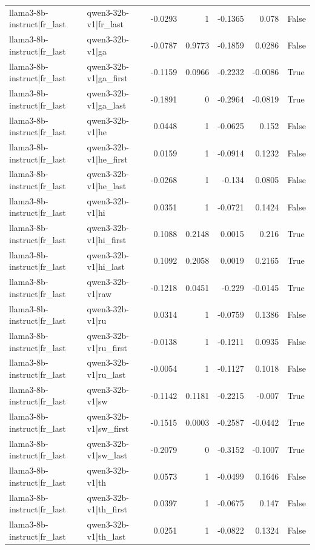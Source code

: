 \begin{table}
\begin{tabular}{l l r r r r l}
llama3-8b-instruct|fr_last & qwen3-32b-v1|fr_last & -0.0293 & 1 & -0.1365 & 0.078 & False \\
llama3-8b-instruct|fr_last & qwen3-32b-v1|ga & -0.0787 & 0.9773 & -0.1859 & 0.0286 & False \\
llama3-8b-instruct|fr_last & qwen3-32b-v1|ga_first & -0.1159 & 0.0966 & -0.2232 & -0.0086 & True \\
llama3-8b-instruct|fr_last & qwen3-32b-v1|ga_last & -0.1891 & 0 & -0.2964 & -0.0819 & True \\
llama3-8b-instruct|fr_last & qwen3-32b-v1|he & 0.0448 & 1 & -0.0625 & 0.152 & False \\
llama3-8b-instruct|fr_last & qwen3-32b-v1|he_first & 0.0159 & 1 & -0.0914 & 0.1232 & False \\
llama3-8b-instruct|fr_last & qwen3-32b-v1|he_last & -0.0268 & 1 & -0.134 & 0.0805 & False \\
llama3-8b-instruct|fr_last & qwen3-32b-v1|hi & 0.0351 & 1 & -0.0721 & 0.1424 & False \\
llama3-8b-instruct|fr_last & qwen3-32b-v1|hi_first & 0.1088 & 0.2148 & 0.0015 & 0.216 & True \\
llama3-8b-instruct|fr_last & qwen3-32b-v1|hi_last & 0.1092 & 0.2058 & 0.0019 & 0.2165 & True \\
llama3-8b-instruct|fr_last & qwen3-32b-v1|raw & -0.1218 & 0.0451 & -0.229 & -0.0145 & True \\
llama3-8b-instruct|fr_last & qwen3-32b-v1|ru & 0.0314 & 1 & -0.0759 & 0.1386 & False \\
llama3-8b-instruct|fr_last & qwen3-32b-v1|ru_first & -0.0138 & 1 & -0.1211 & 0.0935 & False \\
llama3-8b-instruct|fr_last & qwen3-32b-v1|ru_last & -0.0054 & 1 & -0.1127 & 0.1018 & False \\
llama3-8b-instruct|fr_last & qwen3-32b-v1|sw & -0.1142 & 0.1181 & -0.2215 & -0.007 & True \\
llama3-8b-instruct|fr_last & qwen3-32b-v1|sw_first & -0.1515 & 0.0003 & -0.2587 & -0.0442 & True \\
llama3-8b-instruct|fr_last & qwen3-32b-v1|sw_last & -0.2079 & 0 & -0.3152 & -0.1007 & True \\
llama3-8b-instruct|fr_last & qwen3-32b-v1|th & 0.0573 & 1 & -0.0499 & 0.1646 & False \\
llama3-8b-instruct|fr_last & qwen3-32b-v1|th_first & 0.0397 & 1 & -0.0675 & 0.147 & False \\
llama3-8b-instruct|fr_last & qwen3-32b-v1|th_last & 0.0251 & 1 & -0.0822 & 0.1324 & False \\

\end{tabular}
\end{table}
